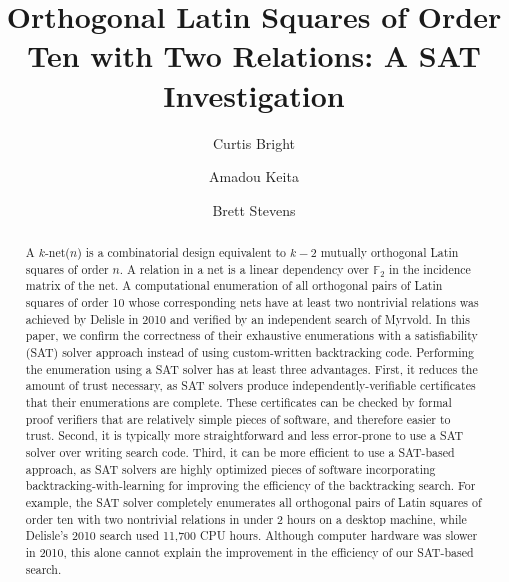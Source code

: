 \documentclass[runningheads]{llncs}
\newcommand{\F}{\mathbb{F}}
\begin{document}
\title{Orthogonal Latin Squares of Order Ten with Two Relations: A SAT Investigation}

\author{Curtis Bright \and
Amadou Keita \and
Brett Stevens}
\maketitle
\begin{abstract}
A $k$-net($n$) is a combinatorial design equivalent to $k-2$ mutually orthogonal Latin squares of order $n$.
A relation in a net is a linear dependency over $\F_2$ in the incidence matrix of the net.
A computational enumeration of all orthogonal pairs of Latin squares of order 10
whose corresponding nets have at least two nontrivial relations was achieved by Delisle in 2010
and verified by an independent search of Myrvold.
In this paper, we confirm the correctness of their exhaustive enumerations
with a satisfiability (SAT) solver approach instead of using custom-written backtracking code.
Performing the enumeration using a SAT solver has at least three advantages.
First, it reduces the amount of trust necessary, as SAT solvers produce independently-verifiable
certificates that their enumerations are complete.
These certificates can be checked by formal proof verifiers that are relatively simple pieces of software, and therefore easier to trust.
Second, it is typically more straightforward and less error-prone to use a SAT solver over writing search code.
Third, it can be more efficient to use a SAT-based approach, as SAT solvers are highly optimized
pieces of software incorporating backtracking-with-learning for improving the
efficiency of the backtracking search.  For example, the SAT solver completely enumerates
all orthogonal pairs of Latin squares of order ten with two nontrivial relations in under 2 hours on
a desktop machine, while Delisle's 2010 search used 11,700 CPU hours.
Although computer hardware was slower in 2010, this alone cannot explain the improvement
in the efficiency of our SAT-based search.
\end{abstract}
\end{document}

